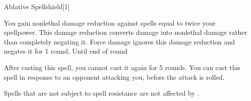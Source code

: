 \begin{spellsection}{Ablative Spellshield}[1]

    \begin{spellheader}
    \end{spellheader}
    \begin{spellcontent}
        \begin{spelltargetinginfo}
        \end{spelltargetinginfo}
        \begin{spelleffects}
            \spelleffect You gain nonlethal damage reduction against spells equal to twice your spellpower. This damage reduction converts damage into nonlethal damage rather than completely negating it. Force damage ignores this damage reduction and negates it for 1 round.
            \spelldur Until end of round
        \end{spelleffects}
    \end{spellcontent}
    \begin{spellfooter}
        \spellnotes After casting this spell, you cannot cast it again for 5 rounds. You can cast this spell in response to an opponent attacking you, before the attack is rolled.

        Spells that are not subject to spell resistance are not affected by .
        \miscastexplode
    \end{spellfooter}
\end{spellsection}

